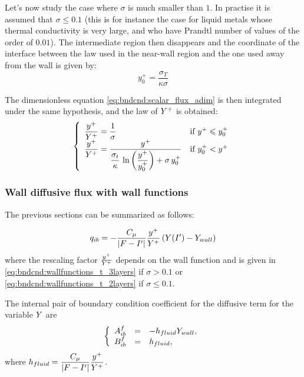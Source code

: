 Let's now study the case where  $\sigma$ is much smaller than $1$.
In practise it is assumed that $\sigma \leqslant 0.1$ (this is for
instance the case for liquid metals whose thermal conductivity is very
large, and who have Prandtl number of values of the order of $0.01$).
The intermediate region then disappears and the coordinate of the
interface between the law used in the near-wall region and the one
used away from the wall is given by:
\begin{equation}
y^+_0= \displaystyle\frac{\sigma_T}{\kappa\sigma}
\end{equation}

The dimensionless equation \eqref{eq:bndcnd:scalar_flux_adim}
is then integrated under the same hypothesis, and the law of
 $Y^+$ is obtained:
\begin{equation}\label{eq:bndcnd:wallfunctions_t_2layers}
\left\{
\begin{array}{ll}
\dfrac{y^+}{Y^+} = \dfrac{1}{\sigma} & \text{if } y^+ \leqslant y^+_0 \\
\dfrac{y^+}{Y^+} = \dfrac{y^+}{\displaystyle\frac{\sigma_t}{\kappa}\,
        \ln\left(\displaystyle\frac{y^+}{y^+_0}\right)+\sigma \,y^+_0}
                   & \text{if } y^+_0 < y^+
\end{array}
\right.
\end{equation}

\subsubsection{Wall diffusive flux with wall functions}
The previous sections can be summarized as follows:

\begin{equation}
q_{ib} = -\dfrac{C_\mu}{\left| F - {I^\prime} \right| } \dfrac{y^+}{Y^+} \left(Y({I^\prime}) - Y_{wall} \right)
\end{equation}
%
where the rescaling factor $\frac{y^+}{Y^+}$ depends on the wall function and is given in \eqref{eq:bndcnd:wallfunctions_t_3layers} if $\sigma >0.1$ or \eqref{eq:bndcnd:wallfunctions_t_2layers} if $\sigma \leq 0.1$.

The internal pair of boundary condition coefficient for the diffusive term for the variable $Y $ are
\begin{equation}
\left\lbrace
\begin{array}{r c l}
A^f_{ib} & = & -h_{fluid} Y_{wall}, \\
B^f_{ib} & = & h_{fluid},
\end{array}
\right.
\end{equation}
where $h_{fluid} = \dfrac{C_\mu}{\left| F - {I^\prime} \right| } \dfrac{y^+}{Y^+} $.

